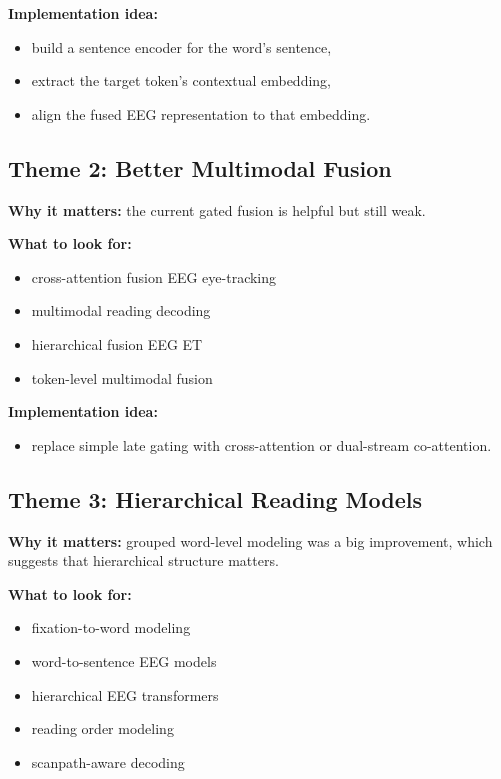\documentclass[11pt]{article}
\begin{document}
\textbf{Implementation idea:}
\begin{itemize}
    \item build a sentence encoder for the word's sentence,
    \item extract the target token's contextual embedding,
    \item align the fused EEG representation to that embedding.
\end{itemize}

\subsection{Theme 2: Better Multimodal Fusion}

\textbf{Why it matters:} the current gated fusion is helpful but still weak.

\textbf{What to look for:}
\begin{itemize}
    \item cross-attention fusion EEG eye-tracking
    \item multimodal reading decoding
    \item hierarchical fusion EEG ET
    \item token-level multimodal fusion
\end{itemize}

\textbf{Implementation idea:}
\begin{itemize}
    \item replace simple late gating with cross-attention or dual-stream co-attention.
\end{itemize}

\subsection{Theme 3: Hierarchical Reading Models}

\textbf{Why it matters:} grouped word-level modeling was a big improvement, which suggests that hierarchical structure matters.

\textbf{What to look for:}
\begin{itemize}
    \item fixation-to-word modeling
    \item word-to-sentence EEG models
    \item hierarchical EEG transformers
    \item reading order modeling
    \item scanpath-aware decoding
\end{itemize}
\end{document}
